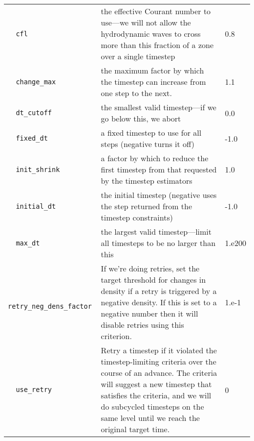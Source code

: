 \begin{landscape}
{\begin{center}
\begin{longtable}{|l|p{5.25in}|l|}
\rowcolor{tableShade}
\verb=  cfl  = &   the effective Courant number to use---we will not allow the hydrodynamic waves to cross more than this fraction of a zone over a single timestep  &  0.8 \\
\verb=  change_max  = &   the maximum factor by which the timestep can increase from one step to the next.  &  1.1 \\
\rowcolor{tableShade}
\verb=  dt_cutoff  = &   the smallest valid timestep---if we go below this, we abort  &  0.0 \\
\verb=  fixed_dt  = &   a fixed timestep to use for all steps (negative turns it off)  &  -1.0 \\
\rowcolor{tableShade}
\verb=  init_shrink  = &   a factor by which to reduce the first timestep from that requested by the timestep estimators  &  1.0 \\
\verb=  initial_dt  = &   the initial timestep (negative uses the step returned from the timestep constraints)  &  -1.0 \\
\rowcolor{tableShade}
\verb=  max_dt  = &   the largest valid timestep---limit all timesteps to be no larger than this  &  1.e200 \\
\verb=  retry_neg_dens_factor  = &   If we're doing retries, set the target threshold for changes in density if a retry is triggered by a negative density. If this is set to a negative number then it will disable retries using this criterion.  &  1.e-1 \\
\rowcolor{tableShade}
\verb=  use_retry  = &   Retry a timestep if it violated the timestep-limiting criteria over the course of an advance. The criteria will suggest a new timestep that satisfies the criteria, and we will do subcycled timesteps on the same level until we reach the original target time.  &  0 \\


\end{longtable}
\end{center}

} %


\end{landscape}

%


